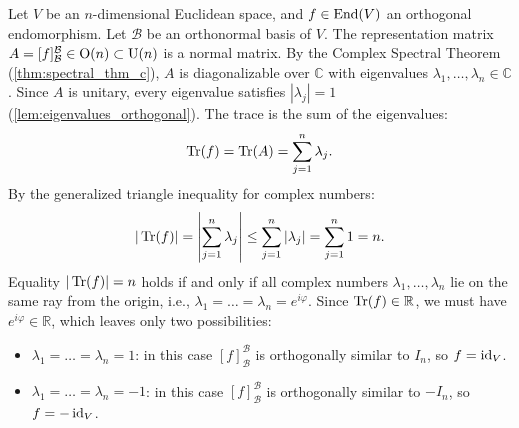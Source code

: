 \begin{exercisesolution}
\label{sol:trace_orthogonal_endomorphism}
Let $V$ be an $n$-dimensional Euclidean space, and $f \in \operatorname{End}(V)$ an orthogonal endomorphism.
Let $\mathcal{B}$ be an orthonormal basis of $V$.
The representation matrix $A = [f]_\mathcal{B}^\mathcal{B} \in \operatorname{O}(n) \subset \operatorname{U}(n)$ is a normal matrix.
By the Complex Spectral Theorem (\cref{thm:spectral_thm_c}), $A$ is diagonalizable over $\mathbb{C}$ with eigenvalues $\lambda_1, \dots, \lambda_n \in \mathbb{C}$.
Since $A$ is unitary, every eigenvalue satisfies $|\lambda_j| = 1$ (\cref{lem:eigenvalues_orthogonal}).
The trace is the sum of the eigenvalues:
\[
\operatorname{Tr}(f) = \operatorname{Tr}(A) = \sum_{j=1}^n \lambda_j.
\]
By the generalized triangle inequality for complex numbers:
\[
|\operatorname{Tr}(f)| = \left| \sum_{j=1}^n \lambda_j \right| \le \sum_{j=1}^n |\lambda_j| = \sum_{j=1}^n 1 = n.
\]
Equality $|\operatorname{Tr}(f)| = n$ holds if and only if all complex numbers $\lambda_1, \dots, \lambda_n$ lie on the same ray from the origin, i.e., $\lambda_1 = \dots = \lambda_n = e^{i\varphi}$.
Since $\operatorname{Tr}(f) \in \mathbb{R}$, we must have $e^{i\varphi} \in \mathbb{R}$, which leaves only two possibilities:
\begin{itemize}
    \item $\lambda_1 = \dots = \lambda_n = 1$: in this case $[f]_\mathcal{B}^\mathcal{B}$ is orthogonally similar to $I_n$, so $f = \operatorname{id}_V$.
    \item $\lambda_1 = \dots = \lambda_n = -1$: in this case $[f]_\mathcal{B}^\mathcal{B}$ is orthogonally similar to $-I_n$, so $f = -\operatorname{id}_V$. \qedhere
\end{itemize}
\end{exercisesolution}

